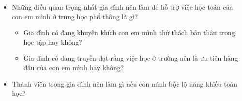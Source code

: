 {{\begin{itemize}
\begin{itemize}
            \item Gia đình có đang nhấn mạnh tầm quan trọng của sự bền bỉ, ngay cả khi con em mình nản lòng, hay không?
          \end{itemize}

        \item Những điều quan trọng nhất gia đình nên làm để hỗ trợ việc học toán của con em mình ở trung học phổ thông là gì?
          \begin{itemize}
            \item Gia đình có đang khuyến khích con em mình thử thách bản thân trong học tập hay không?
            
            \item Gia đình có đang truyền đạt rằng việc học ở trường nên là ưu tiên hàng đầu của con em mình hay không?
          \end{itemize}

        \item Thành viên trong gia đình nên làm gì nếu con mình bộc lộ năng khiếu toán học?
      \end{itemize}}
  }
